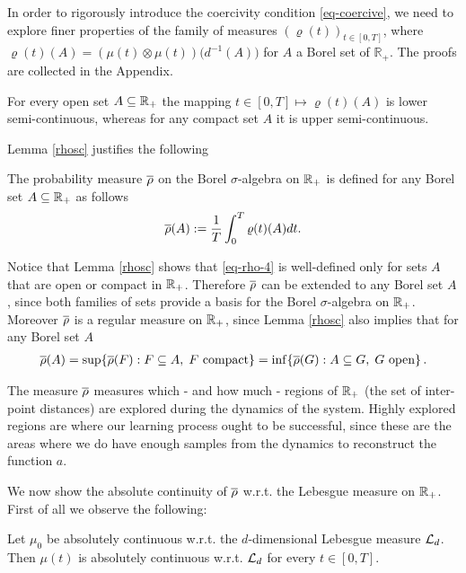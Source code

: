In order to rigorously introduce the coercivity condition \eqref{eq-coercive}, we need to explore finer properties of the family of measures $(\varrho(t))_{t \in [0,T]}$, where 
$\varrho(t)(A)=(\mu(t)\otimes\mu(t))\bigl(d^{-1}(A)\bigr)$ for $A$ a Borel set of $\mathbb{R}_+$.
The proofs are collected in the Appendix.

\begin{lemma}\label{rhosc}
	For every open set $A\subseteq\mathbb{R}_+$ the mapping $t \in [0,T] \mapsto\varrho(t)(A)$ is lower semi-continuous, whereas for
	any compact set $A$ it is upper semi-continuous.
\end{lemma}


Lemma \ref{rhosc} justifies the following
\begin{definition}
The probability measure $\overline\rho$ on the Borel $\sigma$-algebra on $\mathbb{R}_+$ is defined for any Borel set $A \subseteq \mathbb{R}_+$ as follows
\begin{align}\label{eq-rho-4}
	\overline\rho(A):=\frac{1}{T}\int_0^T\varrho(t)(A)dt.
\end{align}
\end{definition}
Notice that Lemma \ref{rhosc} shows that \eqref{eq-rho-4} is well-defined only for sets $A$ that are open or compact in $\mathbb{R}_+$. Therefore $\overline\rho$ can be extended to any Borel set $A$, since both families of sets provide a basis for the Borel $\sigma$-algebra on $\mathbb{R}_+$. Moreover $\overline\rho$ is a regular measure on $\mathbb{R}_+$, since Lemma \ref{rhosc} also implies that for any Borel set $A$
\begin{align*}
	\overline\rho(A) =  \sup\{\overline\rho(F) : F \subseteq A, \;F \text{ compact}\} = \inf\{\overline\rho(G) : A \subseteq G, \;G \text{ open}\}\,.
\end{align*}

\vspace{0.3cm}

The measure $\overline\rho$ measures which - and how much - regions of $\mathbb{R}_+$ (the set of inter-point distances) are explored during the dynamics of the system. Highly explored regions are where our learning process ought to be successful, since these are the areas where we do have enough samples from the dynamics to reconstruct the function $a$.

We now show the absolute continuity of $ \overline\rho$ w.r.t. the Lebesgue measure on $\mathbb{R}_+$. First of all we observe the following:

\begin{lemma}\label{lemma-AC-1}
	Let $\mu_0$ be absolutely continuous w.r.t. the $d$-dimensional Lebesgue measure $\mathcal{L}_d$. Then $\mu(t)$ is absolutely continuous w.r.t. $\mathcal{L}_d$ for every $t\in [0,T]$.
\end{lemma}

